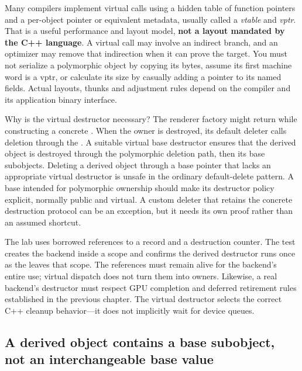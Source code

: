 Many compilers implement virtual calls using a hidden table of function pointers and a per-object pointer or equivalent metadata, usually called a \emph{vtable} and \emph{vptr}. That is a useful performance and layout model, \textbf{not a layout mandated by the C++ language}. A virtual call may involve an indirect branch, and an optimizer may remove that indirection when it can prove the target. You must not serialize a polymorphic object by copying its bytes, assume its first machine word is a vptr, or calculate its size by casually adding a pointer to its named fields. Actual layouts, thunks and adjustment rules depend on the compiler and its application binary interface.

Why is the virtual destructor necessary? The renderer factory might return  while constructing a concrete . When the owner is destroyed, its default deleter calls deletion through the . A suitable virtual base destructor ensures that the derived object is destroyed through the polymorphic deletion path, then its base subobjects. Deleting a derived object through a base pointer that lacks an appropriate virtual destructor is unsafe in the ordinary default-delete pattern. A base intended for polymorphic ownership should make its destructor policy explicit, normally public and virtual. A custom deleter that retains the concrete destruction protocol can be an exception, but it needs its own proof rather than an assumed shortcut.

The lab uses borrowed references to a  record and a destruction counter. The test creates the backend inside a scope and confirms the derived destructor runs once as the  leaves that scope. The references must remain alive for the backend's entire use; virtual dispatch does not turn them into owners. Likewise, a real backend's destructor must respect GPU completion and deferred retirement rules established in the previous chapter. The virtual destructor selects the correct C++ cleanup behavior---it does not implicitly wait for device queues.

\subsection{A derived object contains a base subobject, not an interchangeable base value}\label{01-foundations-i-ch004-a-derived-object-contains-a-base-subobject-not-an-interchangeable-base-value}

